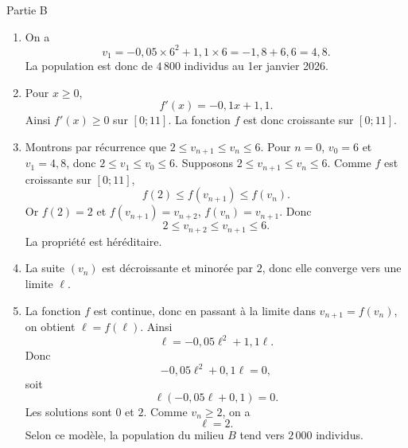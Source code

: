 \documentclass[11pt,a4paper]{article}
\begin{document}
\begin{correctionbox}{Partie B}
\begin{enumerate}
\item On a
\[
v_1=-0{,}05\times6^2+1{,}1\times6=-1{,}8+6{,}6=4{,}8.
\]
La population est donc de $4\,800$ individus au 1er janvier 2026.

\item Pour $x\geqslant0$,
\[
f'(x)=-0{,}1x+1{,}1.
\]
Ainsi $f'(x)\geqslant0$ sur $[0;11]$. La fonction $f$ est donc croissante sur $[0;11]$.

\item Montrons par récurrence que $2\leqslant v_{n+1}\leqslant v_n\leqslant6$.
Pour $n=0$, $v_0=6$ et $v_1=4{,}8$, donc $2\leqslant v_1\leqslant v_0\leqslant6$.
Supposons $2\leqslant v_{n+1}\leqslant v_n\leqslant6$. Comme $f$ est croissante sur $[0;11]$,
\[
f(2)\leqslant f(v_{n+1})\leqslant f(v_n).
\]
Or $f(2)=2$ et $f(v_{n+1})=v_{n+2}$, $f(v_n)=v_{n+1}$. Donc
\[
2\leqslant v_{n+2}\leqslant v_{n+1}\leqslant6.
\]
La propriété est héréditaire.

\item La suite $(v_n)$ est décroissante et minorée par $2$, donc elle converge vers une limite $\ell$.

\item La fonction $f$ est continue, donc en passant à la limite dans $v_{n+1}=f(v_n)$, on obtient $\ell=f(\ell)$.
Ainsi
\[
\ell=-0{,}05\ell^2+1{,}1\ell.
\]
Donc
\[
-0{,}05\ell^2+0{,}1\ell=0,
\]
soit
\[
\ell(-0{,}05\ell+0{,}1)=0.
\]
Les solutions sont $0$ et $2$. Comme $v_n\geqslant2$, on a
\[
\ell=2.
\]
Selon ce modèle, la population du milieu $B$ tend vers $2\,000$ individus.
\end{enumerate}
\end{correctionbox}
\end{document}
